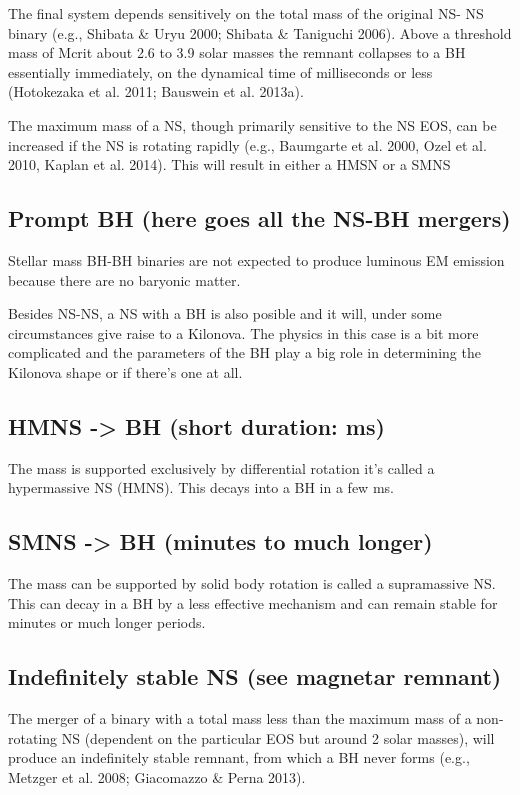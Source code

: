 The final system depends sensitively on the total mass of the original NS- NS binary (e.g., Shibata \& Uryu 2000; Shibata \& Taniguchi 2006). Above a threshold mass of Mcrit about 2.6 to 3.9 solar masses the remnant collapses to a BH essentially immediately, on the dynamical time of milliseconds or less (Hotokezaka et al. 2011; Bauswein et al. 2013a).

The maximum mass of a NS, though primarily sensitive to the NS EOS, can be increased if the NS is rotating rapidly (e.g., Baumgarte et al. 2000, Ozel et al. 2010, Kaplan et al. 2014). This will result in either a HMSN or a SMNS

\subsection{Prompt BH (here goes all the NS-BH mergers)}

Stellar mass BH-BH binaries are not expected to produce luminous EM emission because there are no baryonic matter.

Besides NS-NS, a NS with a BH is also posible and it will, under some circumstances give raise to a Kilonova. The physics in this case is a bit more complicated and the parameters of the BH play a big role in determining the Kilonova shape or if there's one at all.

\subsection{HMNS -> BH (short duration: ms)}

The mass is supported exclusively by differential rotation it's called a hypermassive NS (HMNS).
This decays into a BH in a few ms.

\subsection{SMNS -> BH (minutes to much longer)}

The mass can be supported by solid body rotation is called a supramassive NS.
This can decay in a BH by a less effective mechanism and can remain stable for minutes or much longer periods.

\subsection{Indefinitely stable NS (see magnetar remnant)}

The merger of a binary with a total mass less than the maximum mass of a non-rotating NS (dependent on the particular EOS but around 2 solar masses), will produce an indefinitely stable remnant, from which a BH never forms (e.g., Metzger et al. 2008; Giacomazzo \& Perna 2013).

